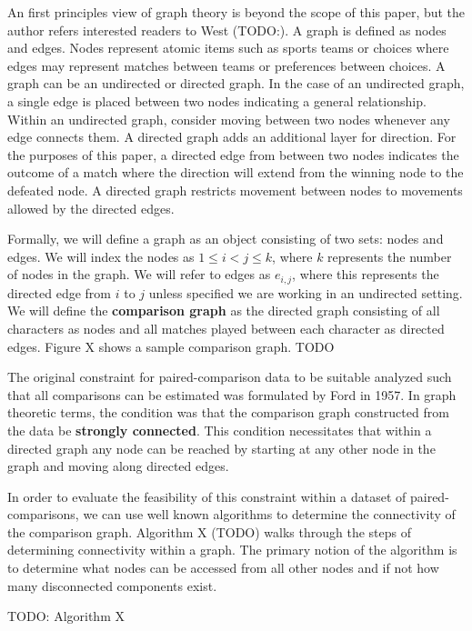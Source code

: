 \documentclass{article}
\begin{document}
An first principles view of graph theory is beyond the scope of this paper, but the author refers interested readers to West (TODO:). A graph is defined as nodes and edges. Nodes represent atomic items such as sports teams or choices where edges may represent matches between teams or preferences between choices. A graph can be an undirected or directed graph. In the case of an undirected graph, a single edge is placed between two nodes indicating a general relationship. Within an undirected graph, consider moving between two nodes whenever any edge connects them. A directed graph adds an additional layer for direction. For the purposes of this paper, a directed edge from between two nodes indicates the outcome of a match where the direction will extend from the winning node to the defeated node. A directed graph restricts movement between nodes to movements allowed by the directed edges. 

Formally, we will define a graph as an object consisting of two sets: nodes and edges. We will index the nodes as $1 \leq i < j \leq k$, where $k$ represents the number of nodes in the graph. We will refer to edges as $e_{i,j}$, where this represents the directed edge from $i$ to $j$ unless specified we are working in an undirected setting. We will define the \textbf{comparison graph} as the directed graph consisting of all characters as nodes and all matches played between each character as directed edges. Figure X shows a sample comparison graph. TODO

The original constraint for paired-comparison data to be suitable analyzed such that all comparisons can be estimated was formulated by Ford in 1957. In graph theoretic terms, the condition was that the comparison graph constructed from the data be \textbf{strongly connected}. This condition necessitates that within a directed graph any node can be reached by starting at any other node in the graph and moving along directed edges. 

In order to evaluate the feasibility of this constraint within a dataset of paired-comparisons, we can use well known algorithms to determine the connectivity of the comparison graph. Algorithm X (TODO) walks through the steps of determining connectivity within a graph. The primary notion of the algorithm is to determine what nodes can be accessed from all other nodes and if not how many disconnected components exist.

TODO: Algorithm X
\end{document}
